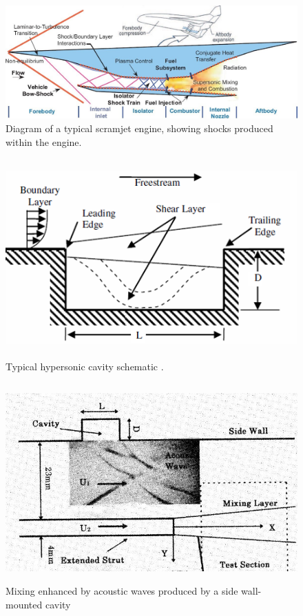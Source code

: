 \newpage

\begin{figure}
\centering
\includegraphics[width=\textwidth]{Figures/scramjet.jpg}
\caption[Scramjet Diagram]{Diagram of a typical scramjet engine, showing shocks produced within the engine. \cite{scramjetFig}}
\label{fig:scramjet}
\end{figure}

\begin{figure}
\centering
\includegraphics[height=3in]{Figures/CavityDiagram.png}
\caption[Diagram of typical cavity]{Typical hypersonic cavity schematic \cite{lazar2008control}.}
\label{fig:Cav}
\end{figure}

\begin{figure}
\centering
\includegraphics[height=3in]{Figures/CavMix.jpg}
\caption[Cavity-Actuated Mixing]{Mixing enhanced by acoustic waves produced by a side wall-mounted cavity \cite{sato1999advanced}}
\label{fig:sato}
\end{figure}

